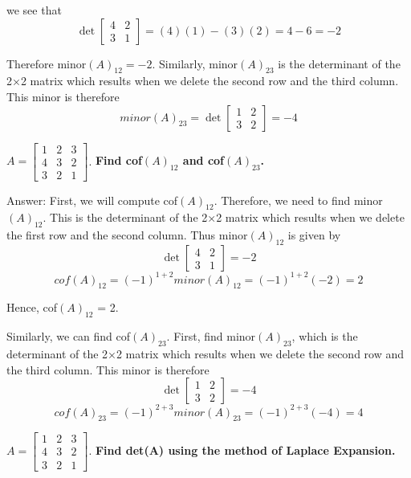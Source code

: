 \documentclass{article}
\begin{document}
\begin{description}[style=nextline]
we see that 
$$\det \left[ \begin{array}{rr} 4 & 2 \\ 3 & 1 \end{array} \right] = \left(4\right)\left(1\right) - \left(3\right)\left(2\right) = 4 - 6 = -2$$

Therefore minor$(A)_{12}=-2$. Similarly, minor$(A)_{23}$ is the determinant of the 2×2 matrix which results when we delete the second row and the third column. This minor is therefore
$$minor \left(A\right)_{23} = \det \left[ \begin{array}{rr} 1 & 2 \\ 3 & 2 \end{array} \right] = -4$$

\item[Question 15: Consider the matrix]
$A = \left[ \begin{array}{rrr} 1 & 2 & 3 \\ 4 & 3 & 2 \\ 3 & 2 & 1 \end{array} \right]$. \textbf{Find cof$(A)_{12}$ and cof$(A)_{23}$.}

Answer: First, we will compute cof$(A)_{12}$. Therefore, we need to find minor$(A)_{12}$. This is the determinant of the 2×2 matrix which results when we delete the first row and the second column. Thus minor$(A)_{12}$ is given by
$$\det \left[ \begin{array}{rr} 4 & 2 \\ 3 & 1 \end{array} \right] = -2$$
$$cof(A)_{12} = (-1)^{1+2} minor(A)_{12} = (-1)^{1+2}(-2) = 2$$

Hence, cof$(A)_{12}$ = 2.

Similarly, we can find cof$(A)_{23}$. First, find minor$(A)_{23}$, which is the determinant of the 2×2 matrix which results when we delete the second row and the third column. This minor is therefore
$$\det \left[ \begin{array}{rr} 1 & 2 \\ 3 & 2 \end{array} \right] = -4$$
$$cof(A)_{23} = (-1)^{2+3} minor(A)_{23} = (-1)^{2+3}(-4) = 4$$

\item[Question 16: Let]
$A=\left[ \begin{array}{rrr} 1 & 2 & 3 \\ 4 & 3 & 2 \\ 3 & 2 & 1 \end{array} \right]$. \textbf{Find det(A) using the method of Laplace Expansion.}


\end{description}
\end{document}
